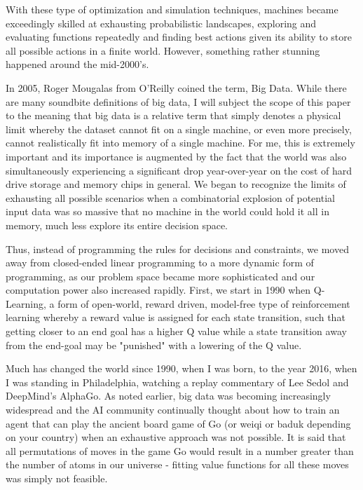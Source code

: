 \documentclass[a4paper,10pt]{extarticle}
\begin{document}
\begin{multicols}{2}
            With these type of optimization and simulation techniques, machines became exceedingly skilled at exhausting probabilistic landscapes, exploring and evaluating functions repeatedly and finding best actions given its ability to store all possible actions in a finite world. However, something rather stunning happened around the mid-2000's.

            In 2005, Roger Mougalas from O'Reilly coined the term, Big Data. While there are many soundbite definitions of big data, I will subject the scope of this paper to the meaning that big data is a relative term that simply denotes a physical limit whereby the dataset cannot fit on a single machine, or even more precisely, cannot realistically fit into memory of a single machine. For me, this is extremely important and its importance is augmented  by the fact that the world was also simultaneously experiencing a significant drop year-over-year on the cost of hard drive storage and memory chips in general. We began to recognize the limits of exhausting all possible scenarios when a combinatorial explosion of potential input data was so massive that no machine in the world could hold it all in memory, much less explore its entire decision space. 

            Thus, instead of programming the rules for decisions and constraints, we moved away from closed-ended linear programming to a more dynamic form of programming, as our problem space became more sophisticated and our computation power also increased rapidly. First, we start in 1990 when Q-Learning, a form of open-world, reward driven, model-free type of reinforcement learning whereby a reward value is assigned for each state transition, such that getting closer to an end goal has a higher Q value while a state transition away from the end-goal may be "punished" with a lowering of the Q value. 

            Much has changed the world since 1990, when I was born, to the year 2016, when I was standing in Philadelphia, watching a replay commentary of Lee Sedol and DeepMind's AlphaGo. As noted earlier, big data was becoming increasingly widespread and the AI community continually thought about how to train an agent that can play the ancient board game of Go (or weiqi or baduk depending on your country) when an exhaustive approach was not possible. It is said that all permutations of moves in the game Go would result in a number greater than the number of atoms in our universe - fitting value functions for all these moves was simply not feasible. 


\end{multicols}
\end{document}

